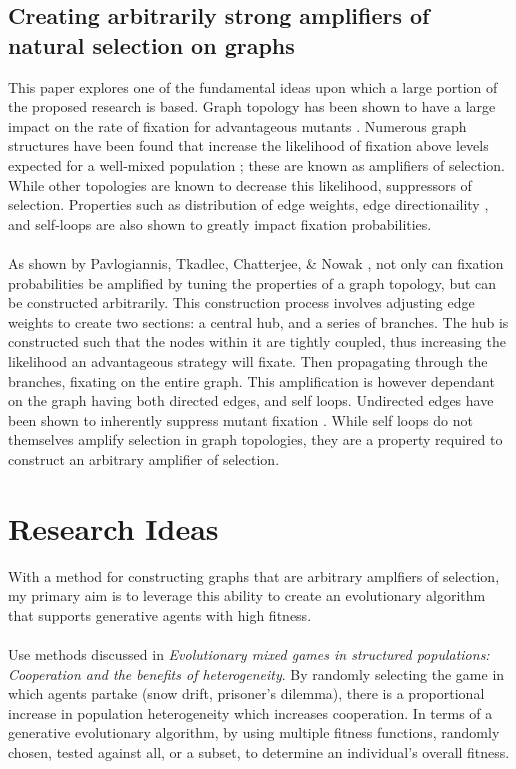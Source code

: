 \documentclass[10pt,a4paper]{article}
\begin{document}
\subsection{Creating arbitrarily strong amplifiers of natural selection on graphs \cite{graph amplifiers}}
This paper explores one of the fundamental ideas upon which a large portion of the proposed research is based.
Graph topology has been shown to have a large impact on the rate of fixation for advantageous mutants \cite{graph amplifiers, birth-death amplifiers, cooperation on graphs}.
Numerous graph structures have been found that increase the likelihood of fixation above levels expected for a well-mixed population \cite{evolution on graphs, birth-death amplifiers}; these are known as amplifiers of selection.
While other topologies are known to decrease this likelihood, suppressors of selection.
Properties such as distribution of edge weights, edge directionaility \cite{birth-death amplifiers}, and self-loops are also shown to greatly impact fixation probabilities.
\\\\
As shown by Pavlogiannis, Tkadlec, Chatterjee, \& Nowak \cite{graph amplifiers}, not only can fixation probabilities be amplified by tuning the properties of a graph topology, but can be constructed arbitrarily.
This construction process involves adjusting edge weights to create two sections: a central hub, and a series of branches.
The hub is constructed such that the nodes within it are tightly coupled, thus increasing the likelihood an advantageous strategy will fixate.
Then propagating through the branches, fixating on the entire graph.
This amplification is however dependant on the graph having both directed edges, and self loops.
Undirected edges have been shown to inherently suppress mutant fixation \cite{birth-death amplifiers}.
While self loops do not themselves amplify selection in graph topologies, they are a property required to construct an arbitrary amplifier of selection.



\pagebreak
\section{Research Ideas}
With a method for constructing graphs that are arbitrary amplfiers of selection, my primary aim is to leverage this ability to create an evolutionary algorithm that supports generative agents with high fitness.
\\\\
Use methods discussed in \textit{Evolutionary mixed games in structured populations: Cooperation and the benefits of heterogeneity}.
By randomly selecting the game in which agents partake (snow drift, prisoner's dilemma), there is a proportional increase in population heterogeneity which increases cooperation.
In terms of a generative evolutionary algorithm, by using multiple fitness functions, randomly chosen, tested against all, or a subset, to determine an individual's overall fitness.
\\\\
\end{document}
